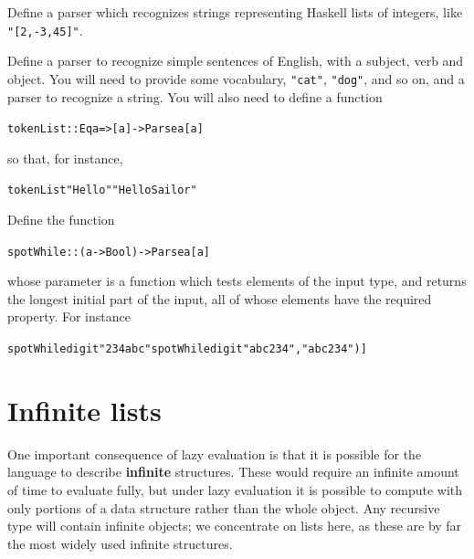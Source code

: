 \begin{exercises}

\item
Define a parser which recognizes strings representing Haskell lists of integers,
like
\texttt{"[2,-3,45]"}.

\item
Define a parser to recognize simple sentences of English, with a subject,
verb and object. You will need to provide some vocabulary, \texttt{"cat"},
\texttt{"dog"}, and so on, and a parser to recognize a string. You will also need
to define a function
\begin{alltt}
tokenList :: Eq a => [a] -> Parse a [a]
\end{alltt}
so that, for instance,
\begin{alltt}
tokenList "Hello" "Hello Sailor" 
\end{alltt}


\item
Define the function
\begin{alltt}
spotWhile :: (a -> Bool) -> Parse a [a]
\end{alltt}
whose parameter is a function which tests elements of the input type, and
returns the longest initial part of the input, all of whose elements have the
required property. For instance
\begin{alltt}
spotWhile digit "234abc"  \step [ ("234","abc") ]
spotWhile digit "abc234"  \step [ ([],"abc234") ]
\end{alltt}

\end{exercises}
\section[Infinite lists]{Infinite lists}
\label{infLists}

One important consequence of lazy evaluation is that it is
possible for the language to describe \textbf{infinite} structures. These
would require an infinite amount of time to evaluate fully, but under lazy
evaluation it is possible to compute with only portions of a data structure rather than
the whole object.  Any recursive
type will contain infinite objects; we concentrate on lists here, as these are
by far the most widely used infinite structures.

